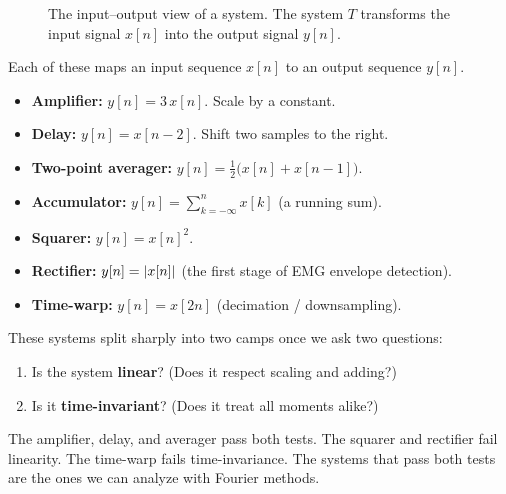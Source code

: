 \begin{figure}[H]
\centering
{}
\caption{The input--output view of a system. The system $T$ transforms the input signal $x[n]$ into the output signal $y[n]$.}
\label{ch12:fig-black-box}
\end{figure}

\begin{example}
\label{ch12:zoo}
Each of these maps an input sequence $x[n]$ to an output sequence $y[n]$.
\begin{itemize}
  \item \textbf{Amplifier:} $y[n] = 3\,x[n]$. Scale by a constant.
  \item \textbf{Delay:} $y[n] = x[n-2]$. Shift two samples to the right.
  \item \textbf{Two-point averager:} $y[n] = \tfrac12\big(x[n] + x[n-1]\big)$.
  \item \textbf{Accumulator:} $y[n] = \sum_{k=-\infty}^{n} x[k]$ (a running sum).
  \item \textbf{Squarer:} $y[n] = x[n]^2$.
  \item \textbf{Rectifier:} $y[n] = \lvert x[n]\rvert$ (the first stage of EMG envelope
        detection).
  \item \textbf{Time-warp:} $y[n] = x[2n]$ (decimation / downsampling).
\end{itemize}
\end{example}

These systems split sharply into two camps once we ask two questions:

\begin{enumerate}
  \item Is the system \textbf{linear}? (Does it respect scaling and adding?)
  \item Is it \textbf{time-invariant}? (Does it treat all moments alike?)
\end{enumerate}

The amplifier, delay, and averager pass both tests. The squarer and rectifier
fail linearity. The time-warp fails time-invariance. The systems that pass both tests are the ones we can analyze with Fourier methods.

